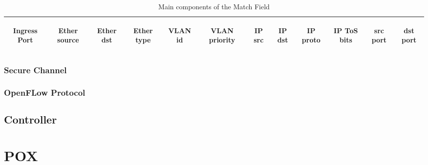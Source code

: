 \begin{table}[h]
\centering
\begin{tabular}{ | c | c | c | c | c | c | c | c | c | c | c | c | }
  \hline                       
  \begin{sideways}Ingress Port\end{sideways} &\begin{sideways}Ether source\end{sideways}  &\begin{sideways}Ether dst\end{sideways}  &\begin{sideways}Ether type\end{sideways}  &\begin{sideways}VLAN id\end{sideways}  &\begin{sideways} VLAN priority\end{sideways} &\begin{sideways}IP src\end{sideways}  &\begin{sideways}IP dst\end{sideways}  &\begin{sideways}IP proto\end{sideways}  &\begin{sideways}IP ToS bits\end{sideways}  &\begin{sideways} src port\end{sideways} &\begin{sideways}dst port\end{sideways}  \\
  \hline  
\end{tabular}
\caption{Main components of the Match Field}
\end{table}

\begin{sideways}\end{sideways}

\subsubsection{Secure Channel}
\label{subsec:SCSecureChannel}

\subsubsection{OpenFLow Protocol}
\label{subsec:OFProtocolSC}

\subsection{Controller}
\label{subsec:OFController}

\section{POX}
\label{sec:BGPOX}
